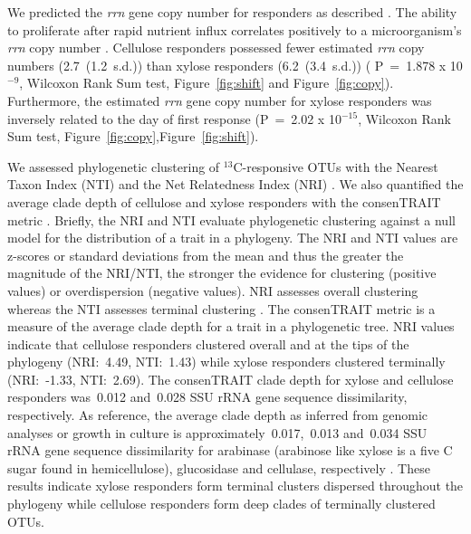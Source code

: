 We predicted the \textit{rrn} gene copy number for responders as described
\citep{Kembel_2012}. The ability to proliferate after rapid nutrient
influx correlates positively to a microorganism's \textit{rrn} copy number
\citep{Klappenbach_2000}. Cellulose responders possessed fewer estimated
\textit{rrn} copy numbers (2.7~(1.2~s.d.)) than xylose responders
(6.2~(3.4~s.d.)) ( P~=~1.878 x 10$^{-9}$, Wilcoxon Rank Sum test,
Figure~\ref{fig:shift} and Figure~\ref{fig:copy}). Furthermore, the
estimated \textit{rrn} gene copy number for xylose responders was
inversely related to the day of first response (P~=~2.02 x 10$^{-15}$,
Wilcoxon Rank Sum test, Figure~\ref{fig:copy},Figure~\ref{fig:shift}).

We assessed phylogenetic clustering of $^{13}$C-responsive OTUs with the
Nearest Taxon Index (NTI) and the Net Relatedness Index (NRI)
\citep{Webb2000}. We also quantified the average clade depth of cellulose and
xylose responders with the consenTRAIT metric \citep{Martiny2013}. Briefly, the
NRI and NTI evaluate phylogenetic clustering against a null model for the
distribution of a trait in a phylogeny. The NRI and NTI values are z-scores or
standard deviations from the mean and thus the greater the magnitude of the
NRI/NTI, the stronger the evidence for clustering (positive values) or
overdispersion (negative values). NRI assesses overall clustering whereas the
NTI assesses terminal clustering \citep{Evans2014a}. The consenTRAIT metric is
a measure of the average clade depth for a trait in a phylogenetic tree. NRI
values indicate that cellulose responders clustered overall and at the tips of
the phylogeny (NRI:~4.49, NTI:~1.43) while xylose responders clustered
terminally (NRI:~-1.33, NTI:~2.69). The consenTRAIT clade depth for xylose and
cellulose responders was~0.012 and~0.028 SSU rRNA gene sequence dissimilarity,
respectively. As reference, the average clade depth as inferred from genomic
analyses or growth in culture is approximately~0.017,~0.013 and~0.034 SSU rRNA gene sequence
dissimilarity for arabinase (arabinose like xylose is a five C sugar found in
hemicellulose), glucosidase and cellulase, respectively
\citep{Martiny2013,Berlemont2013}. These results indicate xylose responders
form terminal clusters dispersed throughout the phylogeny while cellulose
responders form deep clades of terminally clustered OTUs.

